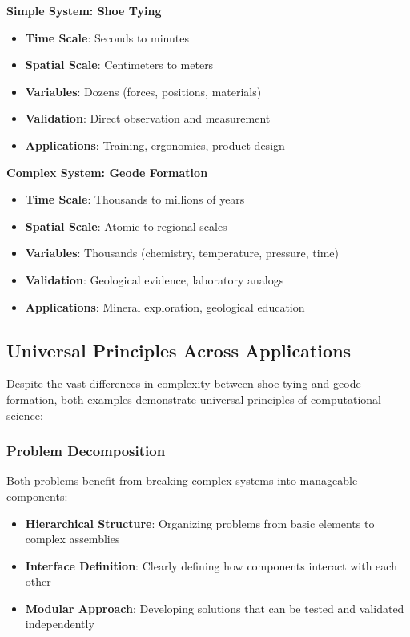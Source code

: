 \begin{examplecountercard}
\textbf{Simple System: Shoe Tying}
\begin{itemize}
    \item \textbf{Time Scale}: Seconds to minutes
    \item \textbf{Spatial Scale}: Centimeters to meters
    \item \textbf{Variables}: Dozens (forces, positions, materials)
    \item \textbf{Validation}: Direct observation and measurement
    \item \textbf{Applications}: Training, ergonomics, product design
\end{itemize}
\tcblower
\textbf{Complex System: Geode Formation}
\begin{itemize}
    \item \textbf{Time Scale}: Thousands to millions of years
    \item \textbf{Spatial Scale}: Atomic to regional scales
    \item \textbf{Variables}: Thousands (chemistry, temperature, pressure, time)
    \item \textbf{Validation}: Geological evidence, laboratory analogs
    \item \textbf{Applications}: Mineral exploration, geological education
\end{itemize}
\end{examplecountercard}

\subsection{Universal Principles Across Applications}

Despite the vast differences in complexity between shoe tying and geode formation, both examples demonstrate universal principles of computational science:

\subsubsection{Problem Decomposition}

Both problems benefit from breaking complex systems into manageable components:
\begin{itemize}
    \item \textbf{Hierarchical Structure}: Organizing problems from basic elements to complex assemblies
    \item \textbf{Interface Definition}: Clearly defining how components interact with each other
    \item \textbf{Modular Approach}: Developing solutions that can be tested and validated independently
\end{itemize}

